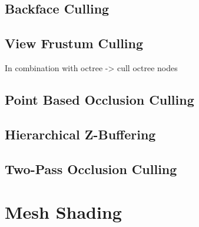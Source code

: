 \subsection{Backface Culling} \label{subsec-backface-culling}

\subsection{View Frustum Culling} \label{subsec-view-frustum-culling}

In combination with octree -> cull octree nodes 

\subsection{Point Based Occlusion Culling} \label{subsec-point-based-occlusion-culling}

\subsection{Hierarchical Z-Buffering} \label{subsec-hierarchical-z-buffering}

\subsection{Two-Pass Occlusion Culling} \label{subsec-two-pass-occlusion-culling}

\section{Mesh Shading}





